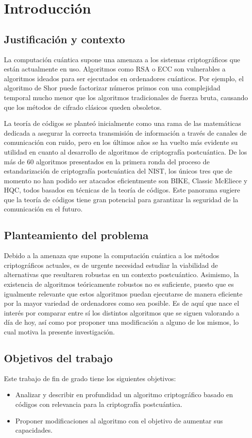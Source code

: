 \newpage{\pagestyle{empty}}
\chapter{Introducción}

\section{Justificación y contexto}

La computación cuántica supone una amenaza a los sistemas criptográficos que están actualmente en uso. Algoritmos como RSA o ECC son vulnerables a algoritmos ideados para ser ejecutados en ordenadores cuánticos. Por ejemplo, el algoritmo de Shor puede factorizar números primos con una complejidad temporal mucho menor que los algoritmos tradicionales de fuerza bruta, causando que los métodos de cifrado clásicos queden obsoletos.

La teoría de códigos se planteó inicialmente como una rama de las matemáticas dedicada a asegurar la correcta transmisión de información a través de canales de comunicación con ruido, pero en los últimos años se ha vuelto más evidente su utilidad en cuanto al desarrollo de algoritmos de criptografía postcuántica. De los más de 60 algoritmos presentados en la primera ronda del proceso de estandarización de criptografía postcuántica del NIST, los únicos tres que de momento no han podido ser atacados eficientmente son BIKE, Classic McEliece y HQC, todos basados en técnicas de la teoría de códigos. Este panorama sugiere que la teoría de códigos tiene gran potencial para garantizar la seguridad de la comunicación en el futuro.

\section{Planteamiento del problema}

Debido a la amenaza que supone la computación cuántica a los métodos criptográficos actuales, es de urgente necesidad estudiar la viabilidad de alternativas que resultaren robustas en un contexto postcuántico. Asimismo, la existencia de algoritmos teóricamente robustos no es suficiente, puesto que es igualmente relevante que estos algoritmos puedan ejecutarse de manera eficiente por la mayor variedad de ordenadores como sea posible. Es de aquí que nace el interés por comparar entre sí los distintos algoritmos que se siguen valorando a día de hoy, así como por proponer una modificación a alguno de los mismos, lo cual motiva la presente investigación.

\section{Objetivos del trabajo}

Este trabajo de fin de grado tiene los siguientes objetivos:
\begin{itemize}
	\item Analizar y describir en profundidad un algoritmo criptográfico basado en códigos con relevancia para la criptografía postcuántica.
	\item Proponer modificaciones al algoritmo con el objetivo de aumentar sus capacidades.
\end{itemize}

